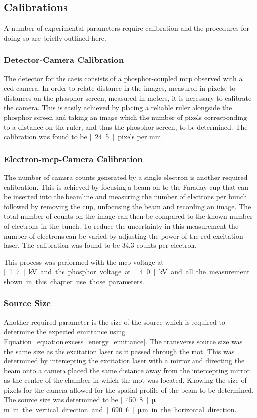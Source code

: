 \subsection{Calibrations}
A number of experimental parameters require calibration and the procedures for doing so are briefly outlined here.

\subsubsection{Detector-Camera Calibration}
The detector for the \gls{caeis} consists of a phosphor-coupled \gls{mcp} observed with a \gls{ccd} camera.
In order to relate distance in the images, measured in pixels, to distances on the phosphor screen, measured in meters, it is necessary to calibrate the camera.
This is easily achieved by placing a reliable ruler alongside the phosphor screen and taking an image which the number of pixels corresponding to a distance on the ruler, and thus the phosphor screen, to be determined.
The calibration was found to be \unit[24.5]{pixels per mm}.

\subsubsection{Electron-\gls{mcp}-Camera Calibration}
The number of camera counts generated by a single electron is another required calibration.
This is achieved by focusing a beam on to the Faraday cup that can be inserted into the beamline and measuring the number of electrons per bunch followed by removing the cup, unfocusing the beam and recording an image.
The total number of counts on the image can then be compared to the known number of electrons in the bunch.
To reduce the uncertainty in this measurement the number of electrons can be varied by adjusting the power of the red excitation laser.
The calibration was found to be 34.3 counts per electron.

This process was performed with the \gls{mcp} voltage at \unit[1.7]{kV} and the phosphor voltage at \unit[4.0]{kV} and all the measurement shown in this chapter use those parameters.

\subsubsection{Source Size}
Another required parameter is the size of the source which is required to determine the expected emittance using Equation~\ref{equation:excess_energy_emittance}.
The transverse source size was the same size as the excitation laser as it passed through the \gls{mot}.
This was determined by intercepting the excitation laser with a mirror and directing the beam onto a camera placed the same distance away from the intercepting mirror as the centre of the chamber in which the \gls{mot} was located.
Knowing the size of pixels for the camera allowed for the spatial profile of the beam to be determined.
The source size was determined to be \unit[450.8]{$\muup$m} in the vertical direction and \unit[690.6]{$\muup$m} in the horizontal direction.

